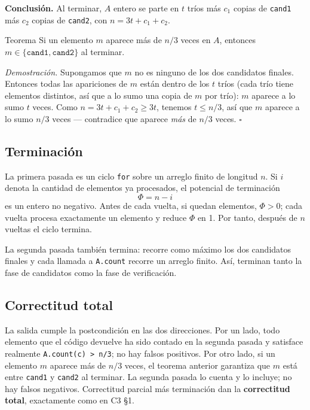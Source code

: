 \documentclass[11pt]{article}
\begin{document}
\textbf{Conclusión.} Al terminar, $A$ entero se parte en $t$ tríos más $c_1$ copias de \texttt{cand1} más
$c_2$ copias de \texttt{cand2}, con $n=3t+c_1+c_2$.

\begin{resultado}{Teorema}
Si un elemento $m$ aparece más de $n/3$ veces en $A$, entonces $m\in\{\texttt{cand1},\texttt{cand2}\}$ al
terminar.
\end{resultado}

\textit{Demostración.} Supongamos que $m$ no es ninguno de los dos candidatos finales. Entonces todas las
apariciones de $m$ están dentro de los $t$ tríos (cada trío tiene elementos distintos, así que a lo sumo una
copia de $m$ por trío): $m$ aparece a lo sumo $t$ veces. Como $n=3t+c_1+c_2\ge 3t$, tenemos $t\le n/3$, así
que $m$ aparece a lo sumo $n/3$ veces --- contradice que aparece \emph{más} de $n/3$ veces. $\square$

\subsection*{Terminación}

La primera pasada es un ciclo \texttt{for} sobre un arreglo finito de longitud $n$. Si $i$ denota la
cantidad de elementos ya procesados, el potencial de terminación
\[
\Phi=n-i
\]
es un entero no negativo. Antes de cada vuelta, si quedan elementos, $\Phi>0$; cada vuelta procesa
exactamente un elemento y reduce $\Phi$ en 1. Por tanto, después de $n$ vueltas el ciclo termina.

La segunda pasada también termina: recorre como máximo los dos candidatos finales y cada llamada a
\texttt{A.count} recorre un arreglo finito. Así, terminan tanto la fase de candidatos como la fase de
verificación.

\subsection*{Correctitud total}

La salida cumple la postcondición en las dos direcciones. Por un lado, todo elemento que el código devuelve
ha sido contado en la segunda pasada y satisface realmente \texttt{A.count(c) > n/3}; no hay falsos positivos.
Por otro lado, si un elemento $m$ aparece más de $n/3$ veces, el teorema anterior garantiza que $m$ está
entre \texttt{cand1} y \texttt{cand2} al terminar. La segunda pasada lo cuenta y lo incluye; no hay falsos
negativos. Correctitud parcial más terminación dan la \textbf{correctitud total}, exactamente como en C3 §1.
\end{document}
